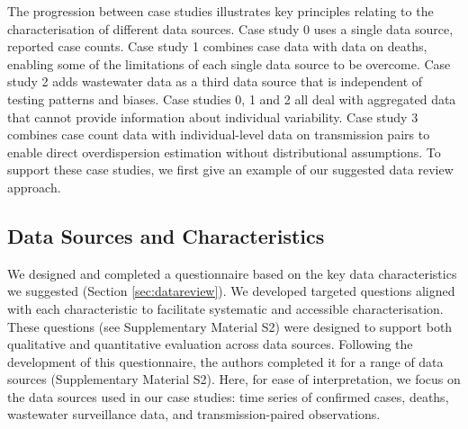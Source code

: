 \documentclass{article}
\begin{document}
The progression between case studies illustrates key principles relating to the characterisation of different data sources. Case study 0 uses a single data source, reported case counts. Case study 1 combines case data with data on deaths, enabling some of the limitations of each single data source to be overcome. Case study 2 adds wastewater data as a third data source that is independent of testing patterns and biases. Case studies 0, 1 and 2 all deal with aggregated data that cannot provide information about individual variability. Case study 3 combines case count data with individual-level data on transmission pairs to enable direct overdispersion estimation without distributional assumptions.
To support these case studies, we first give an example of our suggested data review approach.

\subsection{Data Sources and Characteristics}

We designed and completed a questionnaire based on the key data characteristics we suggested (Section \ref{sec:datareview}). We developed targeted questions aligned with each characteristic to facilitate systematic and accessible characterisation. These questions (see Supplementary Material S2) were designed to support both qualitative and quantitative evaluation across data sources. Following the development of this questionnaire, the authors completed it for a range of data sources (Supplementary Material S2). Here, for ease of interpretation, we focus on the data sources used in our case studies: time series of confirmed cases, deaths, wastewater surveillance data, and transmission-paired observations.
\end{document}
